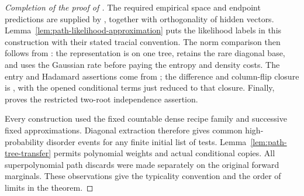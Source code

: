 \begin{proof}[Completion of the proof of ]
The required empirical space and endpoint predictions are supplied
by , together with orthogonality of hidden
vectors.  Lemma~\ref{lem:path-likelihood-approximation} puts the
likelihood labels in this construction with their stated tracial
convention.  The norm comparison then follows from
: the
representation is on one tree, retains the rare diagonal base, and
uses the Gaussian rate before paying the entropy and density costs.
The entry and Hadamard assertions come from
; the difference and column-flip closure is
, with the opened conditional terms
just reduced to that closure.  Finally,
 proves the restricted two-root independence
assertion.

Every construction used the fixed countable dense recipe family and
successive fixed approximations.  Diagonal extraction therefore gives
common high-probability disorder events for any finite initial list
of tests.  Lemma~\ref{lem:path-tree-transfer} permits polynomial
weights and actual conditional copies.  All superpolynomial path
discards were made separately on the original forward marginals.
These observations give the typicality convention and the order of
limits in the theorem.
\end{proof}

